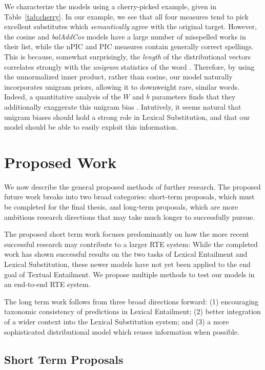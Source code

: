 \documentclass[12pt]{article}
\begin{document}
We characterize the models using a cherry-picked example,
given in Table~\ref{tab:cherry}.  In our example, we see that all four measures
tend to pick excellent substitutes which {\em semantically} agree with the
original target. However, the cosine and {\em balAddCos} models have a large number of
misspelled works in their list, while the nPIC and PIC measures contain
generally correct spellings. This is because, somewhat surprisingly, the {\em
length} of the distributional vectors correlates strongly with the {\em
unigram} statistics of the word \cite{wilson:2015:arxiv}.
Therefore, by using the unnormalized inner
product, rather than cosine, our model naturally incorporates unigram priors,
allowing it to downweight rare, similar words. Indeed, a quantitative analysis
of the $W$ and $b$ parameters finds that they additionally exaggerate this
unigram bias \cite{roller:2016:naacl}.
Intutively, it seems natural that unigram biases should hold a strong role in
Lexical Substitution, and that our model should be able to easily exploit
this information.

\section{Proposed Work}

We now describe the general proposed methods of further research. The proposed
future work breaks into two broad categories: short-term proposals,
which must be completed for the final thesis, and long-term proposals, which
are more ambitious research directions that may take much longer to successfully
pursue.

The proposed short term work focuses predominantly on how the more recent
successful research may contribute to a larger RTE system: While the completed
work has shown successful results on the two tasks of Lexical Entailment and
Lexical Substitution, these newer models have not yet been applied to the end
goal of Textual Entailment. We propose multiple methods to test our models
in an end-to-end RTE system.

The long term work follows from three broad directions forward: (1) encouraging
taxonomic consistency of predictions in Lexical Entailment; (2) better integration
of a wider context into the Lexical Substitution system; and (3) a more sophisticated
distributional model which reuses information when possible.

\subsection{Short Term Proposals}
\end{document}

